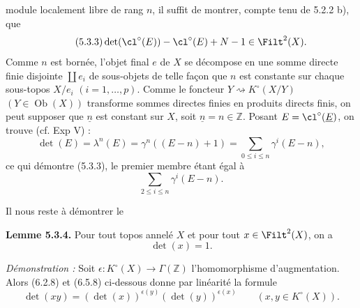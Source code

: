 module localement libre de rang \(n\), il suffit de montrer, compte tenu de 5.2.2 b), que
\begin{equation}\tag{5.3.3}
 \det(\cl^\circ(E))-\cl^\circ(E)+N-1\in\Filt^2(X).
\end{equation}
Comme \(n\) est bornée, l'objet final \(e\) de \(X\) se décompose en une somme directe finie disjointe \(\coprod e_i\) de sous-objets de telle façon que \(n\) est constante sur chaque sous-topos \(X/e_i\) \((i=1,\ldots,p)\). Comme le foncteur \(Y\rightsquigarrow K^\circ(X/Y)\) \((Y\in\operatorname{Ob}(X))\) transforme sommes directes finies en produits directs finis, on peut supposer que \(\underline n\) est constant sur \(X\), soit \(\underline n=n\in\mathbb Z\). Posant \(E=\cl^\circ(\underline E)\), on trouve (cf. Exp V) :
\[
 \det(E)=\lambda^n(E)=\gamma^n((E-n)+1)
 =
 \sum_{0\leq i\leq n}\gamma^i(E-n),
\]
ce qui démontre (5.3.3), le premier membre étant égal à
\[
 \sum_{2\leq i\leq n}\gamma^i(E-n).
\]

Il nous reste à démontrer le

\textbf{Lemme 5.3.4.} Pour tout topos annelé \(X\) et pour tout \(x\in\Filt^2(X)\), on a
\[
 \det(x)=1.
\]

\emph{Démonstration :} Soit \(\epsilon:K^\circ(X)\to\Gamma(\mathbb Z)\) l'homomorphisme d'augmentation. Alors (6.2.8) et (6.5.8) ci-dessous donne par linéarité la formule
\begin{equation}\tag{5.3.5}
 \det(xy)=(\det(x))^{\epsilon(y)}(\det(y))^{\epsilon(x)}
 \qquad(x,y\in K^\circ(X)).
\end{equation}
